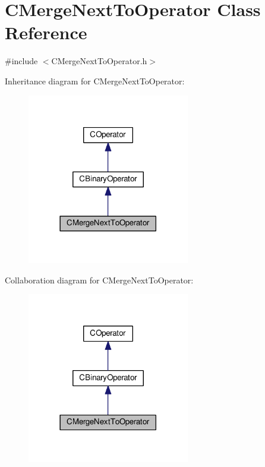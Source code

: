 \hypertarget{classCMergeNextToOperator}{}\section{C\+Merge\+Next\+To\+Operator Class Reference}
\label{classCMergeNextToOperator}


{\ttfamily \#include $<$C\+Merge\+Next\+To\+Operator.\+h$>$}



Inheritance diagram for C\+Merge\+Next\+To\+Operator\+:\nopagebreak
\begin{figure}[H]
\begin{center}
\leavevmode
\includegraphics[width=201pt]{classCMergeNextToOperator__inherit__graph}
\end{center}
\end{figure}


Collaboration diagram for C\+Merge\+Next\+To\+Operator\+:\nopagebreak
\begin{figure}[H]
\begin{center}
\leavevmode
\includegraphics[width=201pt]{classCMergeNextToOperator__coll__graph}
\end{center}
\end{figure}
